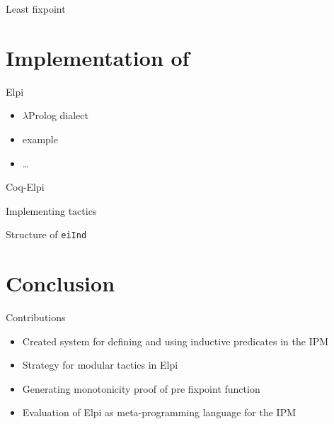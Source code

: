 \documentclass[aspectratio=169]{beamer}
\begin{document}
\begin{frame}{Least fixpoint}

\end{frame}

\section[Implementation of eiInd]{Implementation of }
\begin{frame}{Elpi}
    \begin{itemize}
        \item $\lambda$Prolog dialect
        \item example
        \item \ldots
    \end{itemize}
\end{frame}

\begin{frame}{Coq-Elpi}

\end{frame}

\begin{frame}{Implementing tactics}

\end{frame}

\begin{frame}{Structure of \texttt{eiInd}}

\end{frame}

\section{Conclusion}
\begin{frame}{Contributions}
    \begin{itemize}
        \item Created system for defining and using inductive predicates in the IPM
        \item Strategy for modular tactics in Elpi
        \item Generating monotonicity proof of pre fixpoint function
        \item Evaluation of Elpi as meta-programming language for the IPM
    \end{itemize}
\end{frame}
\end{document}
